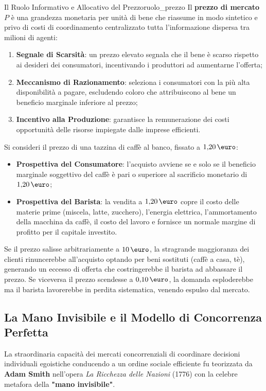 \begin{definizione}{Il Ruolo Informativo e Allocativo del Prezzo}{ruolo_prezzo}
Il \textbf{prezzo di mercato} $P$ è una grandezza monetaria per unità di bene che riassume in modo sintetico e privo di costi di coordinamento centralizzato tutta l'informazione dispersa tra milioni di agenti:
\begin{enumerate}
    \item \textbf{Segnale di Scarsità}: un prezzo elevato segnala che il bene è scarso rispetto ai desideri dei consumatori, incentivando i produttori ad aumentarne l'offerta;
    \item \textbf{Meccanismo di Razionamento}: seleziona i consumatori con la più alta disponibilità a pagare, escludendo coloro che attribuiscono al bene un beneficio marginale inferiore al prezzo;
    \item \textbf{Incentivo alla Produzione}: garantisce la remunerazione dei costi opportunità delle risorse impiegate dalle imprese efficienti.
\end{enumerate}
\end{definizione}

\begin{esempio}
Si consideri il prezzo di una tazzina di caffè al banco, fissato a $1{,}20\,\text{\euro}$:
\begin{itemize}
    \item \textbf{Prospettiva del Consumatore}: l'acquisto avviene se e solo se il beneficio marginale soggettivo del caffè è pari o superiore al sacrificio monetario di $1{,}20\,\text{\euro}$;
    \item \textbf{Prospettiva del Barista}: la vendita a $1{,}20\,\text{\euro}$ copre il costo delle materie prime (miscela, latte, zucchero), l'energia elettrica, l'ammortamento della macchina da caffè, il costo del lavoro e fornisce un normale margine di profitto per il capitale investito.
\end{itemize}
Se il prezzo salisse arbitrariamente a $10\,\text{\euro}$, la stragrande maggioranza dei clienti rinuncerebbe all'acquisto optando per beni sostituti (caffè a casa, tè), generando un eccesso di offerta che costringerebbe il barista ad abbassare il prezzo. Se viceversa il prezzo scendesse a $0{,}10\,\text{\euro}$, la domanda esploderebbe ma il barista lavorerebbe in perdita sistematica, venendo espulso dal mercato.
\end{esempio}

\subsection{La Mano Invisibile e il Modello di Concorrenza Perfetta}
La straordinaria capacità dei mercati concorrenziali di coordinare decisioni individuali egoistiche conducendo a un ordine sociale efficiente fu teorizzata da \textbf{Adam Smith} nell'opera \textit{La Ricchezza delle Nazioni} (1776) con la celebre metafora della \textbf{"mano invisibile"}.

